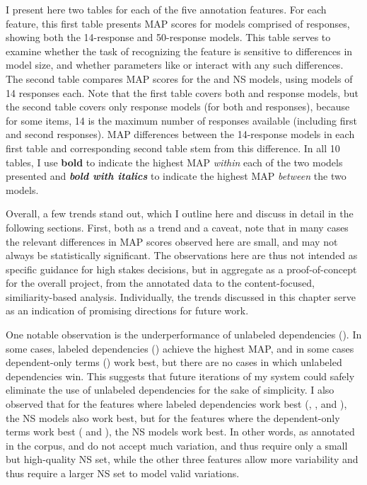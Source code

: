 I present here two tables for each of the five annotation features. For each feature, this first table presents MAP scores for models comprised of  responses, showing both the 14-response and 50-response models. This table serves to examine whether the task of recognizing the feature is sensitive to differences in model size, and whether parameters like  or  interact with any such differences. The second table compares MAP scores for the  and  NS models, using models of 14 responses each. Note that the first table covers both  and  response models, but the second table covers only  response models (for both  and  responses), because for some items, 14 is the maximum number of  responses available (including first and second responses). MAP differences between the  14-response models in each first table and corresponding second table stem from this difference. In all 10 tables, I use \textbf{bold} to indicate the highest  MAP \textit{within} each of the two models presented and \textit{\textbf{bold with italics}} to indicate the highest MAP \textit{between} the two models.

Overall, a few trends stand out, which I outline here and discuss in detail in the following sections. First, both as a trend and a caveat, note that in many cases the relevant differences in MAP scores observed here are small, and may not always be statistically significant.
The observations here are thus not intended as specific guidance for high stakes decisions, but in aggregate as a proof-of-concept for the overall project, from the annotated data to the content-focused, similiarity-based analysis. Individually, the trends discussed in this chapter serve as an indication of promising directions for future work. 

One notable observation is the underperformance of unlabeled dependencies (). In some cases, labeled dependencies () achieve the highest MAP, and in some cases dependent-only terms () work best, but there are no cases in which unlabeled dependencies win. This suggests that future iterations of my system could safely eliminate the use of unlabeled dependencies for the sake of simplicity. I also observed that for the features where labeled dependencies work best (, , and ), the  NS models also work best, but for the features where the dependent-only terms work best ( and ), the  NS models work best. In other words, as annotated in the corpus,  and  do not accept much variation, and thus require only a small but high-quality NS set, while the other three features allow more variability and thus require a larger NS set to model valid variations.

